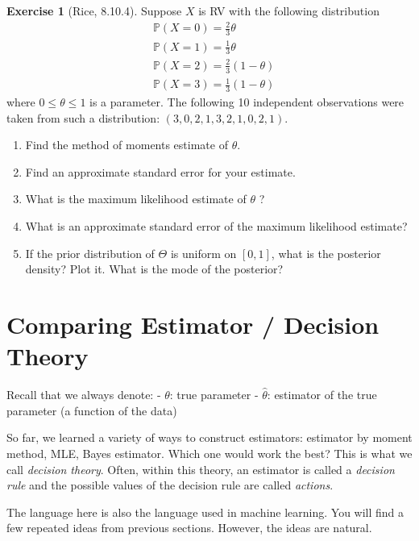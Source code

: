 \documentclass[
  openany]{book}
\providecommand{\tightlist}{%
  \setlength{\itemsep}{0pt}\setlength{\parskip}{0pt}}
\theoremstyle{definition}
\theoremstyle{definition}
\theoremstyle{definition}
\newtheorem{exercise}{Exercise}[chapter]
\theoremstyle{definition}
\theoremstyle{remark}
\begin{document}
\begin{exercise}[Rice, 8.10.4]

Suppose \(X\) is RV with the following distribution
\[
\begin{aligned}
&\mathbb{P}(X= 0) = \frac{2}{3}\theta \\
& \mathbb{P}(X=1)=\frac{1}{3} \theta \\
& \mathbb{P}(X=2)=\frac{2}{3}(1-\theta) \\
& \mathbb{P}(X=3)=\frac{1}{3}(1-\theta)
\end{aligned}
\]
where \(0 \leq \theta \leq 1\) is a parameter. The following 10 independent observations were taken from such a distribution: \((3,0,2,1,3,2,1,0,2,1)\).

\begin{enumerate}
\def\labelenumi{\alph{enumi}.}
\tightlist
\item
  Find the method of moments estimate of \(\theta\).
\item
  Find an approximate standard error for your estimate.
\item
  What is the maximum likelihood estimate of \(\theta\) ?
\item
  What is an approximate standard error of the maximum likelihood estimate?
\item
  If the prior distribution of \(\Theta\) is uniform on \([0,1]\), what is the posterior density? Plot it. What is the mode of the posterior?
\end{enumerate}

\end{exercise}

\section{Comparing Estimator / Decision Theory}\label{comparing-estimator-decision-theory}

Recall that we always denote:
- \(\theta\): true parameter
- \(\hat \theta\): estimator of the true parameter (a function of the data)

So far, we learned a variety of ways to construct estimators: estimator by moment method, MLE, Bayes estimator.
Which one would work the best? This is what we call \emph{decision theory}.
Often, within this theory, an estimator is called a \emph{decision rule} and the possible values of the decision rule are called \emph{actions}.

The language here is also the language used in machine learning. You will find a few repeated ideas from previous sections.
However, the ideas are natural.
\end{document}

